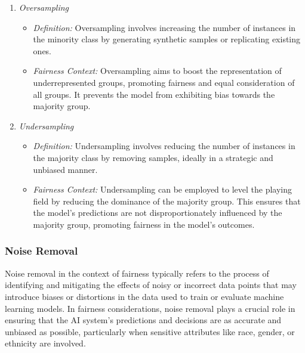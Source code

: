 \documentclass[12pt,a4paper,openright,twoside]{book}
\begin{document}
\begin{enumerate}

    \item \emph{Oversampling}

    \begin{itemize}

        \item \emph{Definition:} Oversampling involves increasing the number of instances in the minority class by generating synthetic samples or replicating existing ones.
        
        \item \emph{Fairness Context:} Oversampling aims to boost the representation of underrepresented groups, promoting fairness and equal consideration of all groups. It prevents the model from exhibiting bias towards the majority group.
    
    \end{itemize}

    \item \emph{Undersampling}

    \begin{itemize}

        \item \emph{Definition:} Undersampling involves reducing the number of instances in the majority class by removing samples, ideally in a strategic and unbiased manner.
        
        \item \emph{Fairness Context:} Undersampling can be employed to level the playing field by reducing the dominance of the majority group. This ensures that the model's predictions are not disproportionately influenced by the majority group, promoting fairness in the model's outcomes.
    
    \end{itemize}

\end{enumerate}

\subsubsection{Noise Removal}

Noise removal in the context of fairness typically refers to the process of identifying and mitigating the effects of noisy or incorrect data points that may introduce biases or distortions in the data used to train or evaluate machine learning models. In fairness considerations, noise removal plays a crucial role in ensuring that the AI system's predictions and decisions are as accurate and unbiased as possible, particularly when sensitive attributes like race, gender, or ethnicity are involved. \cite{NEURIPS2019_8d5e957f}
\end{document}
